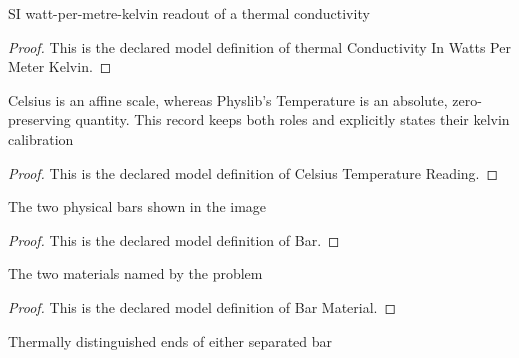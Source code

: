 \begin{definition}
  \label{def:physics:phyx-mini-0468:phyxminiproblems-problemphyxmini0468-thermalconductivityinwattspermeterkelvin}
  SI watt-per-metre-kelvin readout of a thermal conductivity
\end{definition}
\begin{proof}
  This is the declared model definition of thermal Conductivity In Watts Per Meter Kelvin.
\end{proof}
\begin{definition}
  \label{def:physics:phyx-mini-0468:phyxminiproblems-problemphyxmini0468-celsiustemperaturereading}
  Celsius is an affine scale, whereas Physlib's Temperature is an absolute, zero-preserving quantity. This record keeps both roles and explicitly states their kelvin calibration
\end{definition}
\begin{proof}
  This is the declared model definition of Celsius Temperature Reading.
\end{proof}
\begin{definition}[Bar]
  \label{def:physics:phyx-mini-0468:phyxminiproblems-problemphyxmini0468-bar}
  The two physical bars shown in the image
\end{definition}
\begin{proof}
  This is the declared model definition of Bar.
\end{proof}
\begin{definition}
  \label{def:physics:phyx-mini-0468:phyxminiproblems-problemphyxmini0468-barmaterial}
  The two materials named by the problem
\end{definition}
\begin{proof}
  This is the declared model definition of Bar Material.
\end{proof}
\begin{definition}
  \label{def:physics:phyx-mini-0468:phyxminiproblems-problemphyxmini0468-barend}
  Thermally distinguished ends of either separated bar
\end{definition}
